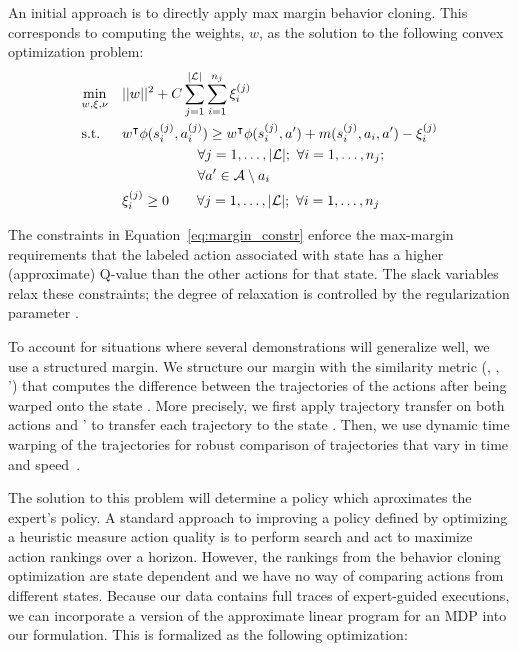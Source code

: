 An initial approach is to directly apply max margin behavior cloning. 
This corresponds to computing the weights, $w$, as the solution to the following  convex optimization problem: 
\begin{align}
& \underset{w, \xi, \nu}{\min}  & & ||\weights{}||^2 + \marginslackc{} \sum_{j=1}^{\labelsetsize{}} \sum_{i=1}^{\nsub{j}} \marginslacksubsup{i}{(j)}\notag \\
& \text{s.t.} & &\weightst{} \features{\statesubsup{i}{(j)}}{\actionsubsup{i}{(j)}} \geq \weightst{} \phi(\statesubsup{i}{(j)}, \actionvar{}') + \marginvar{}(\statesubsup{i}{(j)}, \actionsub{i}, \actionvar{}') - \marginslacksubsup{i}{(j)} \notag\\
    &&&\hspace{1.9cm}\forall j = 1, \ldots, \labelsetsize{}; \text{ } \forall i = 1, \ldots, \nsub{j}; \notag\\
    &&&\hspace{1.9cm}\forall \actionvar{}' \in \actionset{}\setminus \actionvar{}_i  \label{eq:margin_constr}\\
&    & & \marginslacksubsup{i}{(j)} \geq 0 \hspace{0.7cm} \forall j = 1, \ldots, \labelsetsize{}; \text{ } \forall i = 1, \ldots, \nsub{j} \label{eq:margin_slacks}
\end{align}

The constraints in Equation~\ref{eq:margin_constr}
enforce the max-margin requirements that the
labeled action  associated with state 
has a higher (approximate) Q-value than the other actions for that
state. The slack variables  relax these constraints;
the degree of relaxation is controlled by the regularization parameter \marginslackc{}.


To account for situations where several demonstrations will generalize well, we use a structured margin.
We structure our margin with the similarity metric
\marginvar{}(, , \actionvar{}') that computes
the difference between the trajectories of the actions after being warped onto
the state . More precisely, we first apply trajectory
transfer on both actions  and \actionvar{}' to transfer
each trajectory to the state . Then, we use dynamic
time warping of the trajectories for robust comparison of trajectories that
vary in time and speed~\cite{Sakoe_IEEE1978, Vakanski_2012}.

The solution to this problem will determine a policy which aproximates the expert's policy.
A standard approach to improving a policy defined by optimizing a heuristic measure action quality
is to perform search and act to maximize action rankings over a horizon. 
However, the rankings from the behavior cloning optimization are state dependent and 
we have no way of comparing actions from different states. Because our data
contains full traces of expert-guided executions, we can incorporate a version
of the approximate linear program for an MDP into our formulation. This is formalized as the 
following optimization:


